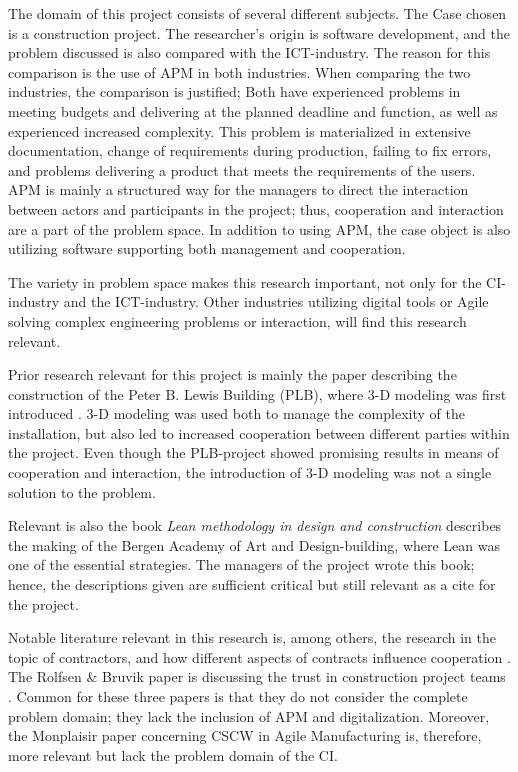 The domain of this project consists of several different subjects. The Case chosen is a construction project. The researcher's origin is software development, and the problem discussed is also compared with the ICT-industry. The reason for this comparison is the use of APM in both industries. When comparing the two industries, the comparison is justified; Both have experienced problems in meeting budgets and delivering at the planned deadline and function, as well as experienced increased complexity. This problem is materialized in extensive documentation, change of requirements during production, failing to fix errors, and problems delivering a product that meets the requirements of the users. APM is mainly a structured way for the managers to direct the interaction between actors and participants in the project; thus, cooperation and interaction are a part of the problem space. In addition to using APM, the case object is also utilizing software supporting both management and cooperation. 

The variety in problem space makes this research important, not only for the CI-industry and the ICT-industry. Other industries utilizing digital tools or Agile solving complex engineering problems or interaction, will find this research relevant. 

Prior research relevant for this project is mainly the paper describing the construction of the Peter B. Lewis Building (PLB), where 3-D modeling was first introduced \cite{frank_gehry}. 3-D modeling was used both to manage the complexity of the installation, but also led to increased cooperation between different parties within the project. Even though the PLB-project showed promising results in means of cooperation and interaction, the introduction of 3-D modeling was not a single solution to the problem. 

Relevant is also the book \textit{Lean methodology in design and construction} \cite{lean_i_praksis} describes the making of the Bergen Academy of Art and Design-building, where Lean was one of the essential strategies. The managers of the project wrote this book; hence, the descriptions given are sufficient critical but still relevant as a cite for the project. 

Notable literature relevant in this research is, among others, the research in the topic of contractors, and how different aspects of contracts influence cooperation \cite{miller2002harmonization, zaghloul2003construction}. The Rolfsen \& Bruvik paper is discussing the trust in construction project teams \cite{rolfsen}. Common for these three papers is that they do not consider the complete problem domain; they lack the inclusion of APM and digitalization. Moreover, the Monplaisir paper concerning CSCW in Agile Manufacturing \cite{monplaisir2002enhancing} is, therefore, more relevant but lack the problem domain of the CI. 

